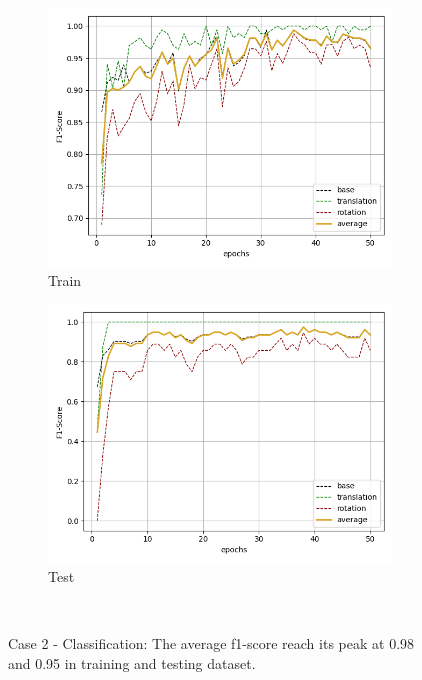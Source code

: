 \begin{figure}[H]
    \begin{subfigure}{.48\linewidth}
    \centering
    \includegraphics[scale=0.45]{Img/cls_noise_train_f1.png}
    \caption{Train}
    \end{subfigure}
    \begin{subfigure}{.48\linewidth}
    \centering
    \includegraphics[scale=0.45]{Img/cls_noise_test_f1.png}
    \caption{Test}
    \end{subfigure}\\
    \caption{Case 2 - Classification: The average f1-score  reach its peak at 0.98 and 0.95 in training and testing dataset.}
    \label{fig:cls_noise_f1}
\end{figure}
